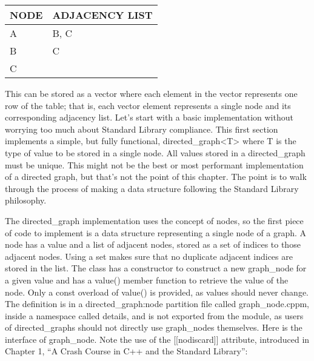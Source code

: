 
\begin{longtable}{|l|l|}
\hline
\textbf{NODE} & \textbf{ADJACENCY LIST} \\ \hline
\endfirsthead
%
\endhead
%
A             & B, C                    \\ \hline
B             & C                       \\ \hline
C             &                         \\ \hline
\end{longtable}

This can be stored as a vector where each element in the vector represents one row of the table; that is, each vector element represents a single node and its corresponding adjacency list. Let’s start with a basic implementation without worrying too much about Standard Library compliance. This first section implements a simple, but fully functional, directed\_graph<T> where T is the type of value to be stored in a single node. All values stored in a directed\_graph must be unique. This might not be the best or most performant implementation of a directed graph, but that’s not the point of this chapter. The point is to walk through the process of making a data structure following the Standard Library philosophy.


The directed\_graph implementation uses the concept of nodes, so the first piece of code to implement is a data structure representing a single node of a graph. A node has a value and a list of adjacent nodes, stored as a set of indices to those adjacent nodes. Using a set makes sure that no duplicate adjacent indices are stored in the list. The class has a constructor to construct a new graph\_node for a given value and has a value() member function to retrieve the value of the node. Only a const overload of value() is provided, as values should never change. The definition is in a directed\_graph:node partition file called graph\_node.cppm, inside a namespace called details, and is not exported from the module, as users of directed\_graphs should not directly use graph\_nodes themselves. Here is the interface of graph\_node. Note the use of the [[nodiscard]] attribute, introduced in Chapter 1, “A Crash Course in C++ and the Standard Library”:

